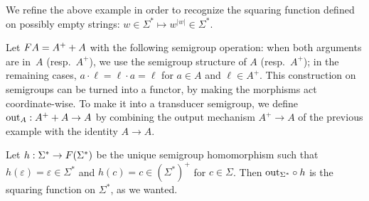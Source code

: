 \begin{example}\label{ex:squaring-empty}
    We refine the above example in order to recognize the squaring function defined on possibly empty strings: $w \in \Sigma^* \mapsto w^{|w|} \in \Sigma^*$.
    
    Let $\functor A = A^+ + A$ with the following semigroup operation: when both arguments are in~$A$ (resp.~$A^+$), we use the semigroup structure of $A$ (resp.~$A^+$); in the remaining cases, $a \cdot \ell = \ell \cdot a = \ell$ for $a \in A$ and $\ell \in A^+$. This construction on semigroups can be turned into a functor, by making the morphisms act coordinate-wise. To make it into a transducer semigroup, we define $\mathrm{out}_A : A^+ + A \to A$ by combining the output mechanism $A^+ \to A$ of the previous example with the identity $A \to A$.
    
    Let $h : \Sigma^* \to \functor(\Sigma^*)$ be the unique semigroup homomorphism such that $h(\varepsilon) = \varepsilon \in \Sigma^*$ and $h(c) = c \in (\Sigma^*)^+$ for $c\in\Sigma$. Then $\mathrm{out}_{\Sigma^*} \circ h$ is the squaring function on $\Sigma^*$, as we wanted.
\end{example}


